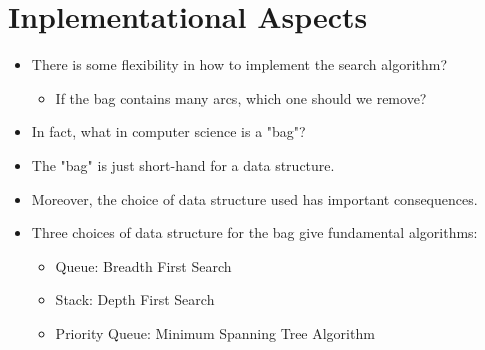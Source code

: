 \documentclass[12pt]{article}
\begin{document}
\section{Inplementational Aspects}
\renewcommand{\labelitemii}{$\circ$}
\renewcommand{\labelitemiii}{$\cdot$}
\renewcommand{\labelitemiii}{$\rightarrow$}
\renewcommand{\labelitemiv}{$\star$}
\begin{itemize}
\item There is some flexibility in how to implement the search algorithm?
	\begin{itemize}
	\item If the bag contains many arcs, which one should we remove?
	\end{itemize}
\item In fact, what in computer science is a "bag"?
\item The "bag" is just short-hand for a data structure.
\item Moreover, the choice of data structure used has important consequences.
\item Three choices of data structure for the bag give fundamental algorithms:
	\begin{itemize}
	\item Queue: Breadth First Search
	\item Stack: Depth First Search
	\item Priority Queue: Minimum Spanning Tree Algorithm
	\end{itemize}
\end{itemize}
\end{document}
